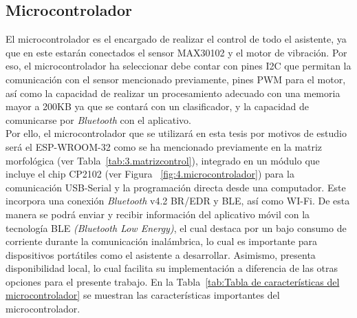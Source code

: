 \subsection{Microcontrolador}
    El microcontrolador es el encargado de realizar el control de todo el asistente, ya que en este estarán conectados el sensor MAX30102 y el motor de vibración. Por eso, el microcontrolador ha seleccionar debe contar con pines I2C que permitan la comunicación con el sensor mencionado previamente, pines PWM para el motor, así como la capacidad de realizar un procesamiento adecuado con una memoria mayor a 200KB ya que se contará con un clasificador, y la capacidad de comunicarse por \textit{Bluetooth} con el aplicativo.\\
    
    Por ello, el microcontrolador que se utilizará en esta tesis por motivos de estudio será el ESP-WROOM-32 como se ha mencionado previamente en la matriz morfológica (ver Tabla~\ref{tab:3.matrizcontrol}), integrado en un módulo que incluye el chip CP2102 (ver Figura ~\ref{fig:4.microcontrolador}) para la comunicación USB-Serial y la programación directa desde una computador. Este incorpora una conexión \textit{Bluetooth} v4.2 BR/EDR y BLE, así como WI-Fi. De esta manera se podrá enviar y recibir información del aplicativo móvil con la tecnología BLE \textit{(Bluetooth Low Energy)}, el cual destaca por un bajo consumo de corriente durante la comunicación inalámbrica, lo cual es importante para dispositivos portátiles como el asistente a desarrollar. Asimismo, presenta disponibilidad local, lo cual facilita su implementación a diferencia de las otras opciones para el presente trabajo. En la Tabla~\ref{tab:Tabla de características del microcontrolador} se muestran las características importantes del microcontrolador.
    

